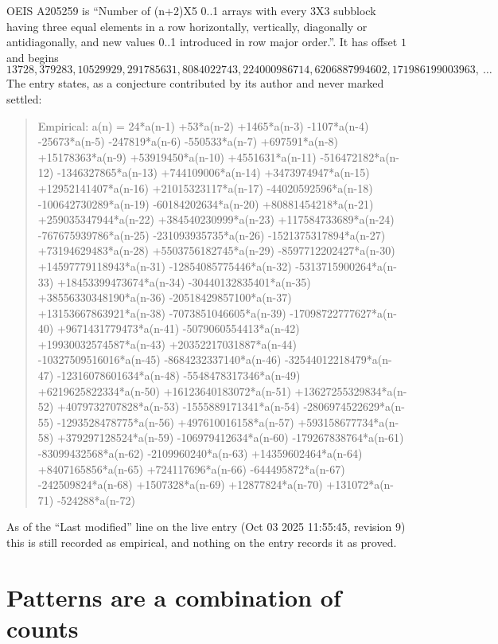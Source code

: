 \documentclass[11pt,a4paper]{article}
\theoremstyle{plain}
\theoremstyle{definition}
\begin{document}
OEIS A205259 is ``Number of (n+2)X5 0..1 arrays with every 3X3 subblock having three equal elements in a row horizontally, vertically, diagonally or antidiagonally, and new values 0..1 introduced in row major order.''. It has offset $1$ and begins
\[
13728, 379283, 10529929, 291785631, 8084022743, 224000986714, 6206887994602, 171986199003963,\ \dots
\]
The entry states, as a conjecture contributed by its author and never marked settled:
\begin{quote}
Empirical: a(n) = 24*a(n-1) +53*a(n-2) +1465*a(n-3) -1107*a(n-4) -25673*a(n-5) -247819*a(n-6) -550533*a(n-7) +697591*a(n-8) +15178363*a(n-9) +53919450*a(n-10) +4551631*a(n-11) -516472182*a(n-12) -1346327865*a(n-13) +744109006*a(n-14) +3473974947*a(n-15) +12952141407*a(n-16) +21015323117*a(n-17) -44020592596*a(n-18) -100642730289*a(n-19) -60184202634*a(n-20) +80881454218*a(n-21) +259035347944*a(n-22) +384540230999*a(n-23) +117584733689*a(n-24) -767675939786*a(n-25) -231093935735*a(n-26) -1521375317894*a(n-27) +73194629483*a(n-28) +5503756182745*a(n-29) -8597712202427*a(n-30) +14597779118943*a(n-31) -12854085775446*a(n-32) -5313715900264*a(n-33) +18453399473674*a(n-34) -30440132835401*a(n-35) +38556330348190*a(n-36) -20518429857100*a(n-37) +13153667863921*a(n-38) -7073851046605*a(n-39) -17098722777627*a(n-40) +9671431779473*a(n-41) -5079060554413*a(n-42) +19930032574587*a(n-43) +20352217031887*a(n-44) -10327509516016*a(n-45) -8684232337140*a(n-46) -32544012218479*a(n-47) -12316078601634*a(n-48) -5548478317346*a(n-49) +6219625822334*a(n-50) +16123640183072*a(n-51) +13627255329834*a(n-52) +4079732707828*a(n-53) -1555889171341*a(n-54) -2806974522629*a(n-55) -1293528478775*a(n-56) +497610016158*a(n-57) +593158677734*a(n-58) +379297128524*a(n-59) -106979412634*a(n-60) -179267838764*a(n-61) -83099432568*a(n-62) -2109960240*a(n-63) +14359602464*a(n-64) +8407165856*a(n-65) +724117696*a(n-66) -644495872*a(n-67) -242509824*a(n-68) +1507328*a(n-69) +12877824*a(n-70) +131072*a(n-71) -524288*a(n-72)
\end{quote}
As of the ``Last modified'' line on the live entry (Oct 03 2025 11:55:45, revision 9) this is still
recorded as empirical, and nothing on the entry records it as proved.

\section{Patterns are a combination of counts}
\end{document}
